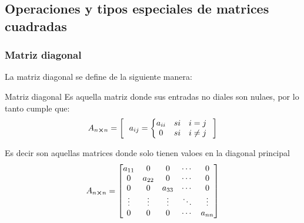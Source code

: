 \subsection{Operaciones y tipos especiales de matrices cuadradas}
\subsubsection{Matriz diagonal}
La matriz diagonal se define de la siguiente manera:
\begin{Theorem*} {Matriz diagonal}
	Es aquella matriz donde sus entradas no diales son nulaes, por lo tanto cumple que:
	$$
		A_{n\cross n}=\left[ \ \ a_{ij}=\left\{\begin{matrix}
			a_{ii} & si & i=j \\
			0 & si & i\ne j
		\end{matrix}\right. \ \ \right]
	$$
\end{Theorem*}
Es decir son aquellas matrices donde solo tienen valoes en la diagonal principal
$$
	A_{n\cross n}=\begin{bmatrix}
		a_{11} & 0 & 0 & \cdots & 0 \\
		0 & a_{22} & 0 & \cdots & 0 \\
		0 & 0 & a_{33} & \cdots & 0 \\
		\vdots & \vdots & \vdots & \ddots & \vdots \\
		0 & 0 & 0 & \cdots & a_{nn}
	\end{bmatrix}
$$
